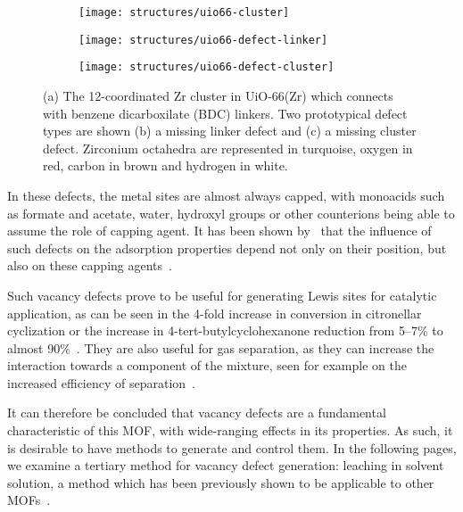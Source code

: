 \begin{figure}[tb]
	\centering

	\begin{subfigure}[b]{0.3\linewidth}
		\parbox[c]{0.15\linewidth}{\caption{}%
			\label{defects:fgr:uio66-cluster}}%
		\parbox[b]{0.85\linewidth}{%
			\texttt{[image: structures/uio66-cluster]}%
		}%
	\end{subfigure}
	\begin{subfigure}[b]{0.3\linewidth}
		\parbox[c]{0.15\linewidth}{\caption{}%
			\label{defects:fgr:uio66-defect-linker}}%
		\parbox[b]{0.85\linewidth}{%
			\texttt{[image: structures/uio66-defect-linker]}%
		}%
	\end{subfigure}
	\begin{subfigure}[b]{0.3\linewidth}
		\parbox[c]{0.15\linewidth}{\caption{}%
			\label{defects:fgr:uio66-defect-cluster}}%
		\parbox[b]{0.85\linewidth}{%
			\texttt{[image: structures/uio66-defect-cluster]}%
		}%
	\end{subfigure}

	\caption{(a) The 12-coordinated Zr cluster in UiO-66(Zr)
		which connects with benzene dicarboxilate (BDC) linkers.
		Two prototypical defect types are shown (b) a missing
		linker defect and (c) a missing cluster defect. Zirconium
		octahedra are represented in turquoise, oxygen in red,
		carbon in brown and hydrogen in white.}%
	\label{defects:fgr:uio66}

\end{figure}

In these defects, the metal sites are almost always capped,
with monoacids such as formate and acetate, water, hydroxyl groups
or other counterions being able
to assume the role of capping agent. It has been shown
by~\citeauthor{thorntonDefectsMetalOrganic2016} that the influence
of such defects on the adsorption properties depend not only
on their position, but also on these capping
agents~\cite{thorntonDefectsMetalOrganic2016}. 

Such vacancy defects prove to be useful for generating Lewis
sites for catalytic application, as can be seen in the 
4-fold increase in conversion in citronellar cyclization or
the increase in 4-tert-butylcyclohexanone reduction from 
5--7\% to almost 90\%~\cite{vermoorteleSynthesisModulationTool2013}.
They are also useful for gas separation, as they can increase the 
interaction towards a component of the mixture, seen for example
on the increased efficiency of 
separation~\cite{thorntonDefectsMetalOrganic2016}.

It can therefore be concluded that vacancy defects are a fundamental 
characteristic of this MOF, with wide-ranging effects in its 
properties.
As such, it is desirable to have methods to generate and control
them. In the following pages, we examine a tertiary method 
for vacancy defect generation: leaching in solvent
solution, a method which has been previously shown to be applicable 
to other MOFs~\cite{tuOrderedVacanciesTheir2014}.

